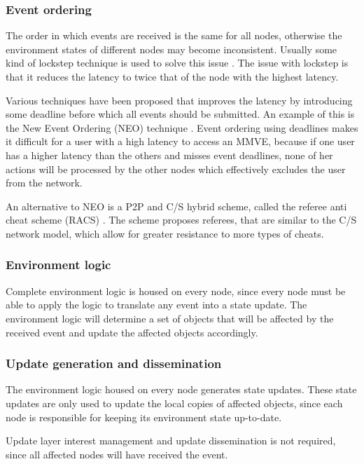 \subsubsection{Event ordering}
\label{event_based_event_ordering}

The order in which events are received is the same for all nodes, otherwise the environment states of different nodes may become inconsistent.
Usually some kind of lockstep technique is used to solve this issue \cite{pessimistic_lock_step}. The issue with lockstep is that it reduces the latency to twice that of the node with the highest latency.

Various techniques have been proposed that improves the latency by introducing some deadline before which all events should be submitted. An example of this is the New Event Ordering (NEO) technique \cite{cheat_proof_event_ordering}. Event ordering using deadlines makes it difficult for a user with a high latency to access an MMVE, because if one user has a higher latency than the others and misses event deadlines, none of her actions will be processed by the other nodes which effectively excludes the user from the network.

An alternative to NEO is a P2P and C/S hybrid scheme, called the referee anti cheat scheme (RACS) \cite{cheating_taxonomy}. The scheme proposes referees, that are similar to the C/S network model, which allow for greater resistance to more types of cheats.

\subsubsection{Environment logic}
Complete environment logic is housed on every node, since every node must be able to apply the logic to translate any event into a state update. The environment logic will determine a set of objects that will be affected by the received event and update the affected objects accordingly.

\subsubsection{Update generation and dissemination}

The environment logic housed on every node generates state updates. These state updates are only used to update the local copies of affected objects, since each node is responsible for keeping its environment state up-to-date.

Update layer interest management and update dissemination is not required, since all affected nodes will have received the event.

